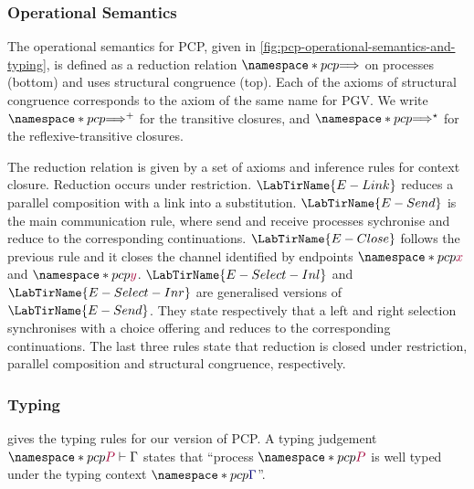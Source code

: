 \documentclass[main.tex]{subfiles}
\begin{document}
\subsubsection*{Operational Semantics}
The operational semantics for PCP, given in \cref{fig:pcp-operational-semantics-and-typing}, is defined as a reduction relation $\pcp{\red}$ on processes (bottom) and uses structural congruence (top). Each of the axioms of structural congruence corresponds to the axiom of the same name for PGV. We write $\pcp{\red^+}$ for the transitive closures, and $\pcp{\red^\star}$ for the reflexive-transitive closures.

The reduction relation is given by a set of axioms and inference rules for context closure. Reduction occurs under restriction. $\LabTirName{E-Link}$ reduces a parallel composition with a link into a substitution. $\LabTirName{E-Send}$ is the main communication rule, where send and receive processes sychronise and reduce to the corresponding continuations. $\LabTirName{E-Close}$ follows the previous rule and it closes the channel identified by endpoints $\pcp{\tm{x}}$ and $\pcp{\tm{y}}$. $\LabTirName{E-Select-Inl}$ and $\LabTirName{E-Select-Inr}$ are generalised versions of $\LabTirName{E-Send}$. They state respectively that a left and right selection synchronises with a choice offering and reduces to the corresponding continuations. The last three rules state that reduction is closed under restriction, parallel composition and structural congruence, respectively. 

\subsubsection*{Typing}
 gives the typing rules for our version of PCP. A typing judgement $\pcp{\seq{P}{\Gamma}}$ states that ``process $\pcp{\tm{P}}$ is well typed under the typing context $\pcp{\ty{\Gamma}}$''.
\end{document}
